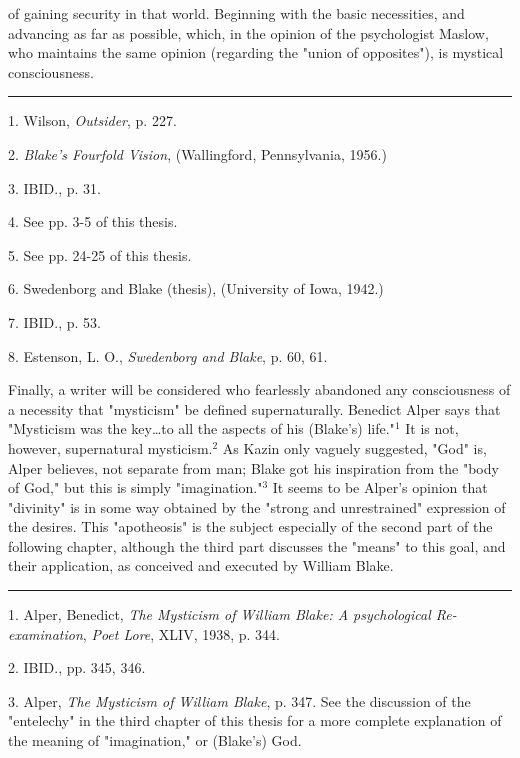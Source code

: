 of gaining security in that world. Beginning with the basic necessities, and advancing as far
as possible, which, in the opinion of the psychologist Maslow, who maintains the same opinion (regarding the
"union of opposites"), is mystical consciousness.\par
\vspace*{\fill}
\noindent\rule{0.25\textwidth}{0.4pt}\par
1. Wilson, \textit{Outsider}, p. 227.\par
2. \textit{Blake's Fourfold Vision}, (Wallingford, Pennsylvania, 1956.)\par
3. IBID., p. 31.\par
4. See pp. 3-5 of this thesis.\par
5. See pp. 24-25 of this thesis.\par
6. Swedenborg and Blake (thesis), (University of Iowa, 1942.)\par
7. IBID., p. 53.\par
8. Estenson, L. O., \textit{Swedenborg and Blake}, p. 60, 61.\par

\newpage

Finally, a writer will be considered who fearlessly abandoned any consciousness of a necessity
that "mysticism" be defined supernaturally. Benedict Alper says that
"Mysticism was the key\dots to all the aspects of his (Blake's) life."$^{1}$
It is not, however, supernatural mysticism.$^{2}$ As Kazin only vaguely
suggested, "God" is, Alper believes, not separate from man; Blake got his
inspiration from the "body of God," but this is simply "imagination."$^{3}$ It seems
to be Alper's opinion that "divinity" is in some way obtained by the "strong and
unrestrained" expression of the desires. This "apotheosis" is the subject especially of the
second part of the following chapter, although the third part discusses the "means"
to this goal, and their application, as conceived and executed by William Blake.\par
\vspace*{\fill}
\noindent\rule{0.25\textwidth}{0.4pt}\par
1. Alper, Benedict, \textit{The Mysticism of William Blake: A psychological Re-examination}, \textit{Poet Lore}, XLIV, 1938, p. 344.\par
2. IBID., pp. 345, 346.\par
3. Alper, \textit{The Mysticism of William Blake}, p. 347. See the discussion of the "entelechy" in the 
third chapter of this thesis for a more complete explanation of the meaning of "imagination," or (Blake's) God.\par

